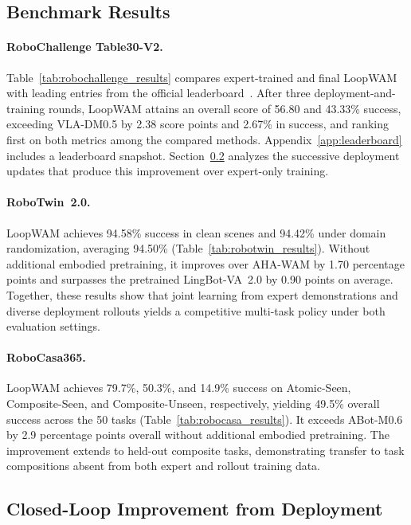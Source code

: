 \subsection{Benchmark Results}
\label{sec:benchmark_results}

\paragraph{RoboChallenge Table30-V2.}
Table~\ref{tab:robochallenge_results} compares expert-trained and final LoopWAM with leading entries from the official leaderboard~\citep{robochallenge2026leaderboard}.
After three deployment-and-training rounds, LoopWAM attains an overall score of 56.80 and 43.33\% success, exceeding VLA-DM0.5 by 2.38 score points and 2.67\% in success, and ranking first on both metrics among the compared methods.
Appendix~\ref{app:leaderboard} includes a leaderboard snapshot.
Section~\ref{sec:closed_loop_results} analyzes the successive deployment updates that produce this improvement over expert-only training.

\paragraph{RoboTwin~2.0.}
LoopWAM achieves 94.58\% success in clean scenes and 94.42\% under domain randomization, averaging 94.50\% (Table~\ref{tab:robotwin_results}).
Without additional embodied pretraining, it improves over AHA-WAM by 1.70 percentage points and surpasses the pretrained LingBot-VA~2.0 by 0.90 points on average.
Together, these results show that joint learning from expert demonstrations and diverse deployment rollouts yields a competitive multi-task policy under both evaluation settings.

\paragraph{RoboCasa365.}
LoopWAM achieves 79.7\%, 50.3\%, and 14.9\% success on Atomic-Seen, Composite-Seen, and Composite-Unseen, respectively, yielding 49.5\% overall success across the 50 tasks (Table~\ref{tab:robocasa_results}).
It exceeds ABot-M0.6 by 2.9 percentage points overall without additional embodied pretraining.
The improvement extends to held-out composite tasks, demonstrating transfer to task compositions absent from both expert and rollout training data.

\subsection{Closed-Loop Improvement from Deployment}
\label{sec:closed_loop_results}

